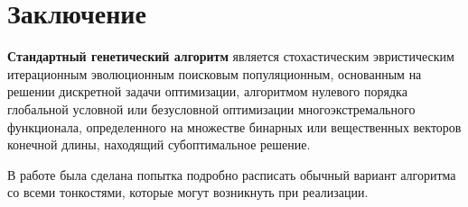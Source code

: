 \chapter*{Заключение}

\textbf{Стандартный генетический алгоритм} является стохастическим эвристическим итерационным эволюционным поисковым популяционным, основанным на решении дискретной задачи оптимизации, алгоритмом нулевого порядка глобальной условной или безусловной оптимизации многоэкстремального функционала, определенного на множестве бинарных или вещественных векторов конечной длины, находящий субоптимальное решение.

В работе была сделана попытка подробно расписать обычный вариант алгоритма со всеми тонкостями, которые могут возникнуть при реализации.

\clearpage